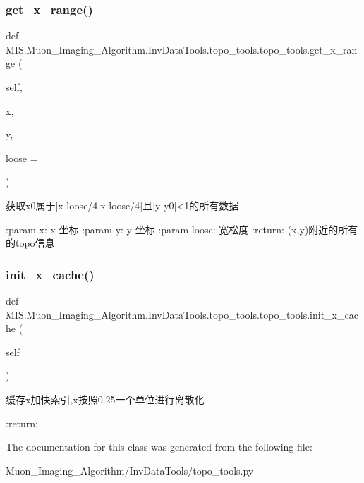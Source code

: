 \subsubsection{\texorpdfstring{get\+\_\+x\+\_\+range()}{get\_x\_range()}}
{\footnotesize\ttfamily def M\+I\+S.\+Muon\+\_\+\+Imaging\+\_\+\+Algorithm.\+Inv\+Data\+Tools.\+topo\+\_\+tools.\+topo\+\_\+tools.\+get\+\_\+x\+\_\+range (\begin{DoxyParamCaption}\item[{}]{self,  }\item[{}]{x,  }\item[{}]{y,  }\item[{}]{loose = {} }\end{DoxyParamCaption})}

\begin{DoxyVerb}获取x0属于[x-loose/4,x-loose/4]且|y-y0|<1的所有数据

:param x: x 坐标
:param y: y 坐标
:param loose: 宽松度
:return: (x,y)附近的所有的topo信息
\end{DoxyVerb}
 \mbox{\label{classMIS_1_1Muon__Imaging__Algorithm_1_1InvDataTools_1_1topo__tools_1_1topo__tools_ab6ace6a26214199ba30804a28d8270b4}} 
\subsubsection{\texorpdfstring{init\+\_\+x\+\_\+cache()}{init\_x\_cache()}}
{\footnotesize\ttfamily def M\+I\+S.\+Muon\+\_\+\+Imaging\+\_\+\+Algorithm.\+Inv\+Data\+Tools.\+topo\+\_\+tools.\+topo\+\_\+tools.\+init\+\_\+x\+\_\+cache (\begin{DoxyParamCaption}\item[{}]{self }\end{DoxyParamCaption})}

\begin{DoxyVerb}缓存x加快索引,x按照0.25一个单位进行离散化

:return:
\end{DoxyVerb}
 

The documentation for this class was generated from the following file\+:\begin{DoxyCompactItemize}
\item 
Muon\+\_\+\+Imaging\+\_\+\+Algorithm/\+Inv\+Data\+Tools/topo\+\_\+tools.\+py\end{DoxyCompactItemize}
